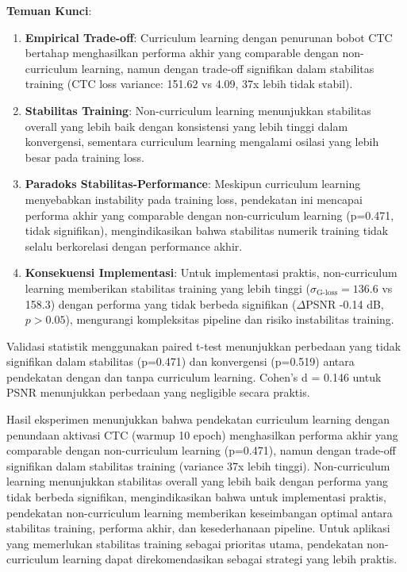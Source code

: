 \documentclass[12pt,a4paper]{article}
\begin{document}
\textbf{Temuan Kunci}:
\begin{enumerate}
    \item \textbf{Empirical Trade-off}: Curriculum learning dengan penurunan bobot CTC bertahap menghasilkan performa akhir yang comparable dengan non-curriculum learning, namun dengan trade-off signifikan dalam stabilitas training (CTC loss variance: 151.62 vs 4.09, 37x lebih tidak stabil).
    \item \textbf{Stabilitas Training}: Non-curriculum learning menunjukkan stabilitas overall yang lebih baik dengan konsistensi yang lebih tinggi dalam konvergensi, sementara curriculum learning mengalami osilasi yang lebih besar pada training loss.
    \item \textbf{Paradoks Stabilitas-Performance}: Meskipun curriculum learning menyebabkan instability pada training loss, pendekatan ini mencapai performa akhir yang comparable dengan non-curriculum learning (p=0.471, tidak signifikan), mengindikasikan bahwa stabilitas numerik training tidak selalu berkorelasi dengan performance akhir.
    \item \textbf{Konsekuensi Implementasi}: Untuk implementasi praktis, non-curriculum learning memberikan stabilitas training yang lebih tinggi ($\sigma_{\text{G-loss}} = 136.6$ vs 158.3) dengan performa yang tidak berbeda signifikan ($\Delta$PSNR -0.14 dB, $p>0.05$), mengurangi kompleksitas pipeline dan risiko instabilitas training.
\end{enumerate}

Validasi statistik menggunakan paired t-test menunjukkan perbedaan yang tidak signifikan dalam stabilitas (p=0.471) dan konvergensi (p=0.519) antara pendekatan dengan dan tanpa curriculum learning. Cohen's d = 0.146 untuk PSNR menunjukkan perbedaan yang negligible secara praktis.

Hasil eksperimen menunjukkan bahwa pendekatan curriculum learning dengan penundaan aktivasi CTC (warmup 10 epoch) menghasilkan performa akhir yang comparable dengan non-curriculum learning (p=0.471), namun dengan trade-off signifikan dalam stabilitas training (variance 37x lebih tinggi). Non-curriculum learning menunjukkan stabilitas overall yang lebih baik dengan performa yang tidak berbeda signifikan, mengindikasikan bahwa untuk implementasi praktis, pendekatan non-curriculum learning memberikan keseimbangan optimal antara stabilitas training, performa akhir, dan kesederhanaan pipeline. Untuk aplikasi yang memerlukan stabilitas training sebagai prioritas utama, pendekatan non-curriculum learning dapat direkomendasikan sebagai strategi yang lebih praktis.
\end{document}
